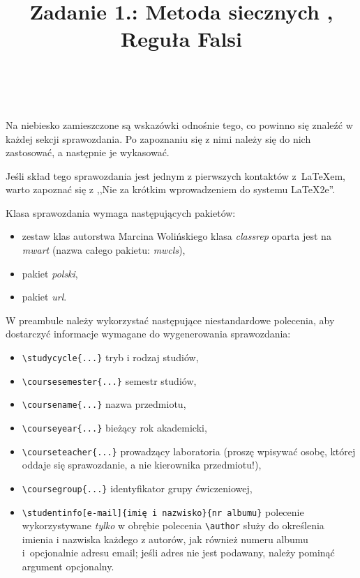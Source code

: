 \documentclass{classrep}
\author{%
  \studentinfo[229963@edu.p.lodz.pl]{Daniel Modrzejewski}{229963}\\
  \studentinfo[------@edu.p.lodz.pl]{Mateusz Srebnik}{-----}%
}
\title{Zadanie 1.: Metoda siecznych , Reguła Falsi}
\begin{document}
\maketitle
\thispagestyle{fancyplain}

{\color{blue}
Na niebiesko zamieszczone są wskazówki odnośnie tego, co powinno się znaleźć
w każdej sekcji sprawozdania. Po zapoznaniu się z nimi należy się do nich
zastosować, a następnie je wykasować.}

{\color{blue}
Jeśli skład tego sprawozdania jest jednym z pierwszych kontaktów
z~\LaTeX\dywiz em, warto zapoznać się z ,,Nie za krótkim wprowadzeniem do
systemu \LaTeX2e''\cite{l2short}.}

{\color{blue}
Klasa sprawozdania wymaga następujących pakietów:
\begin{itemize}
  \item zestaw klas autorstwa Marcina Wolińskiego \ppauza klasa \emph{classrep}
  oparta jest na \emph{mwart} (nazwa całego pakietu: \emph{mwcls}),
  \item pakiet \emph{polski},
  \item pakiet \emph{url}.
\end{itemize}}

{\color{blue}
W preambule należy wykorzystać następujące niestandardowe polecenia, aby
dostarczyć informacje wymagane do wygenerowania sprawozdania:
\begin{itemize}
  \item \verb+\studycycle{...}+ \ppauza tryb i rodzaj studiów,
  \item \verb+\coursesemester{...}+ \ppauza semestr studiów,
  \item \verb+\coursename{...}+ \ppauza nazwa przedmiotu,
  \item \verb+\courseyear{...}+ \ppauza bieżący rok akademicki,
  \item \verb+\courseteacher{...}+ \ppauza prowadzący laboratoria (proszę
  wpisywać osobę, której oddaje się sprawozdanie, a nie kierownika
  przedmiotu!),
  \item \verb+\coursegroup{...}+ \ppauza identyfikator grupy ćwiczeniowej,
  \item \verb+\studentinfo[e-mail]{imię i nazwisko}{nr albumu}+ \ppauza
  polecenie wykorzystywane \emph{tylko} w obrębie polecenia \verb+\author+
  służy do określenia imienia i nazwiska każdego z autorów, jak również
  numeru albumu i~opcjonalnie adresu e\dywiz mail; jeśli adres nie jest
  podawany, należy pominąć argument opcjonalny.
\end{itemize}}
\end{document}
